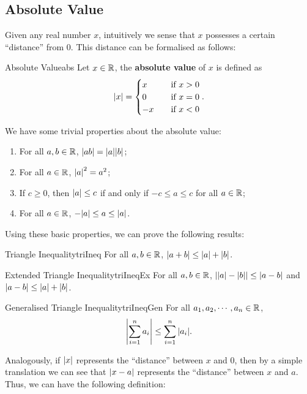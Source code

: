 \documentclass[math]{amznotes}
\theoremstyle{remark}
\begin{document}
\subsection{Absolute Value}
Given any real number $x$, intuitively we sense that $x$ possesses a certain ``distance'' from $0$. This distance can be formalised as follows:
\begin{dfnbox}{Absolute Value}{abs}
    Let $x \in \mathbb{R}$, the {\color{red} \textbf{absolute value}} of $x$ is defined as
    \begin{displaymath}
        {\left\lvert {x} \right\rvert} = \begin{cases}
            x \quad & \textrm{if } x > 0 \\
            0 \quad & \textrm{if } x = 0 \\
            -x \quad & \textrm{if } x < 0
        \end{cases}.
    \end{displaymath}
\end{dfnbox}
We have some trivial properties about the absolute value:
\begin{enumerate}
    \item For all $a, b \in \mathbb{R}$, ${\left\lvert {ab} \right\rvert} = {\left\lvert {a} \right\rvert}{\left\lvert {b} \right\rvert}$;
    \item For all $a \in \mathbb{R}$, ${\left\lvert {a} \right\rvert}^2 = a^2$;
    \item If $c \geq 0$, then ${\left\lvert {a} \right\rvert} \leq c$ if and only if $-c \leq a \leq c$ for all $a \in \mathbb{R}$;
    \item For all $a \in \mathbb{R}$, $-{\left\lvert {a} \right\rvert} \leq a \leq {\left\lvert {a} \right\rvert}$.
\end{enumerate}
Using these basic properties, we can prove the following results:
\begin{thmbox}{Triangle Inequality}{triIneq}
    For all $a, b \in \mathbb{R}$, ${\left\lvert {a + b} \right\rvert} \leq {\left\lvert {a} \right\rvert} + {\left\lvert {b} \right\rvert}$.
\end{thmbox}
\begin{corbox}{Extended Triangle Inequality}{triIneqEx}
    For all $a, b \in \mathbb{R}$, ${\left\lvert {{\left\lvert {a} \right\rvert} - {\left\lvert {b} \right\rvert}} \right\rvert} \leq {\left\lvert {a - b} \right\rvert}$ and ${\left\lvert {a - b} \right\rvert} \leq {\left\lvert {a} \right\rvert} + {\left\lvert {b} \right\rvert}$.
\end{corbox}
\begin{corbox}{Generalised Triangle Inequality}{triIneqGen}
    For all $a_1, a_2, \cdots, a_n \in \mathbb{R}$, 
    \begin{equation*}
        {\left\lvert {\sum_{i = 1}^{n}a_i} \right\rvert} \leq \sum_{i = 1}^{n}{\left\lvert {a_i} \right\rvert}.
    \end{equation*}
\end{corbox}
Analogously, if ${\left\lvert {x} \right\rvert}$ represents the ``distance'' between $x$ and $0$, then by a simple translation we can see that ${\left\lvert {x - a} \right\rvert}$ represents the ``distance'' between $x$ and $a$. Thus, we can have the following definition:
\end{document}
